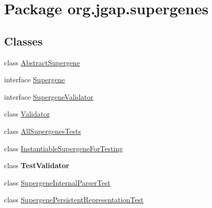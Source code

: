 \hypertarget{namespaceorg_1_1jgap_1_1supergenes}{\section{Package org.\-jgap.\-supergenes}
\label{namespaceorg_1_1jgap_1_1supergenes}
}
\subsection*{Classes}
\begin{DoxyCompactItemize}
\item 
class \hyperlink{classorg_1_1jgap_1_1supergenes_1_1_abstract_supergene}{Abstract\-Supergene}
\item 
interface \hyperlink{interfaceorg_1_1jgap_1_1supergenes_1_1_supergene}{Supergene}
\item 
interface \hyperlink{interfaceorg_1_1jgap_1_1supergenes_1_1_supergene_validator}{Supergene\-Validator}
\item 
class \hyperlink{classorg_1_1jgap_1_1supergenes_1_1_validator}{Validator}
\item 
class \hyperlink{classorg_1_1jgap_1_1supergenes_1_1_all_supergenes_tests}{All\-Supergenes\-Tests}
\item 
class \hyperlink{classorg_1_1jgap_1_1supergenes_1_1_instantiable_supergene_for_testing}{Instantiable\-Supergene\-For\-Testing}
\item 
class {\bfseries Test\-Validator}
\item 
class \hyperlink{classorg_1_1jgap_1_1supergenes_1_1_supergene_internal_parser_test}{Supergene\-Internal\-Parser\-Test}
\item 
class \hyperlink{classorg_1_1jgap_1_1supergenes_1_1_supergene_persistent_representation_test}{Supergene\-Persistent\-Representation\-Test}
\end{DoxyCompactItemize}
